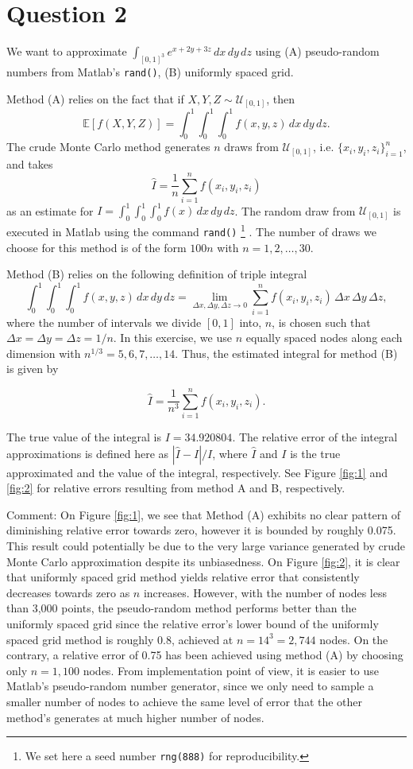 \documentclass[11pt]{article}
\renewcommand{\E}{\mathbb{E}} %
\newcommand{\1}{\mathbbm{1}}
\newcommand{\U}{\mathcal{U}} %
\newcounter{daggerfootnote}
\newcommand*{\daggerfootnote}[1]{%
	\setcounter{daggerfootnote}{\value{footnote}}%
	\renewcommand*{\thefootnote}{\fnsymbol{footnote}}%
	\footnote[2]{#1}%
	\setcounter{footnote}{\value{daggerfootnote}}%
	\renewcommand*{\thefootnote}{\arabic{footnote}}%
}
\begin{document}
\section*{Question 2}
We want to approximate $\int_{[0,1]^3}e^{x+2y +3z} \,dx \,dy \,dz$ using (A) pseudo-random numbers from Matlab’s \texttt{rand()}, (B) uniformly
spaced grid. 

Method (A) relies on the fact that if $X,Y,Z\sim \U_{[0,1]}$, then 
\[\E[f(X,Y,Z)]=\int_0^1\int_0^1\int_0^1f(x,y,z)\,dx\,dy\,dz.\] 
The crude Monte Carlo method generates $n$ draws from $\U_{[0,1]}$, i.e. $\{x_i,y_i,z_i\}_{i=1}^n$, and takes
\[\hat{I}=\frac{1}{n}\sum_{i=1}^nf(x_i,y_i,z_i)\]
as an estimate for $I=\int_0^1\int_0^1\int_0^1f(x) \,dx \,dy\, dz$. The random draw from $\U_{[0,1]}$ is executed in Matlab using the command \texttt{rand()}\daggerfootnote{We set here a seed number \texttt{rng(888)} for reproducibility.}. The number of draws we choose for this method is of the form $100n$ with $n = 1, 2,\ldots, 30$. 

Method (B) relies on the following definition of triple integral
\[\int_0^1 \int_0^1 \int_0^1 f(x,y,z) \,dx \,dy \,dz = \lim_{\Delta x,\Delta y,\Delta z \rightarrow 0} \sum_{i=1}^n f(x_i,y_i,z_i) \,\Delta x\,\Delta y\,\Delta z,\]
where the number of intervals we divide $[0,1]$ into, $n$, is chosen such that $\Delta x=\Delta y=\Delta z =1/n$. In this exercise, we use $n$ equally spaced nodes along each dimension with $n^{1/3}=5,6,7,\ldots,14$. Thus, the estimated integral for method (B) is given by 

\[\hat{I}=\frac{1}{n^3}\sum_{i=1}^n f(x_i,y_i,z_i).\]

The true value of the integral is $I=34.920804$. The relative error of the integral approximations is defined here as $|\hat{I}-I|/I$, where $\hat{I}$ and $I$ is the true approximated and the value of the integral, respectively. See Figure \ref{fig:1} and \ref{fig:2} for relative errors resulting from method A and B, respectively.

Comment: On Figure \ref{fig:1}, we see that Method (A) exhibits no clear pattern of diminishing relative error towards zero, however it is bounded by roughly 0.075. This result could potentially be due to the very large variance generated by crude Monte Carlo approximation despite its unbiasedness. On Figure \ref{fig:2}, it is clear that uniformly spaced grid method yields relative error that consistently decreases towards zero as $n$ increases. However, with the number of nodes less than 3,000 points, the pseudo-random method performs better than the uniformly spaced grid since the relative error's lower bound of the uniformly spaced grid method is roughly 0.8, achieved at $n=14^3=2,744$ nodes. On the contrary, a relative error of 0.75 has been achieved using method (A) by choosing only $n=1,100$ nodes. From implementation point of view, it is easier to use Matlab's pseudo-random number generator, since we only need to sample a smaller number of nodes to achieve the same level of error that the other method's generates at much higher number of nodes.  
\end{document}
